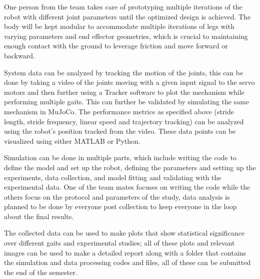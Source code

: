 \documentclass[12pt]{article}
\begin{document}
One person from the team takes care of prototyping multiple iterations of the robot with different joint parameters until the optimized design is achieved. The body will be kept modular to accommodate multiple iterations of legs with varying parameters and end effector geometries, which is crucial to maintaining enough contact with the ground to leverage friction and move forward or backward.

System data can be analyzed by tracking the motion of the joints, this can be done by taking a video of the joints moving with a given input signal to the servo motors and then further using a Tracker software to plot the mechanism while performing multiple gaits. This can further be validated by simulating the same mechanism in MuJoCo. The performance metrics as specified above (stride length, stride frequency, linear speed and trajectory tracking) can be analyzed using the robot's position tracked from the video. These data points can be visualized using either MATLAB or Python.

Simulation can be done in multiple parts, which include writing the code to define the model and set up the robot, defining the parameters and setting up the experiments, data collection, and model fitting and validating with the experimental data. One of the team mates focuses on writing the code while the others focus on the protocol and parameters of the study, data analysis is planned to be done by everyone post collection to keep everyone in the loop about the final results.

The collected data can be used to make plots that show statistical significance over different gaits and experimental studies; all of these plots and relevant images can be used to make a detailed report along with a folder that contains the simulation and data processing codes and files, all of these can be submitted the end of the semester.



    
    
\end{document}
